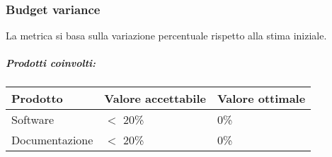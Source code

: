 \documentclass[a4paper, 12pt]{article}
\begin{document}
\subsubsection{Budget variance}
La metrica si basa sulla variazione percentuale rispetto alla stima iniziale.

\subparagraph{Prodotti coinvolti:}
\begin{center}
	\begin{tabularx}{\textwidth}{|X|X|X|}
		\hline
		\textbf{Prodotto} & \textbf{Valore accettabile } & \textbf{Valore ottimale } \\
		\hline
		Software          & $<$ 20\%                     & 0\%                       \\
		\hline
		Documentazione    & $<$ 20\%                     & 0\%                       \\
		\hline
	\end{tabularx}\\[8pt]
	\mbox{}\\
\end{center}
\end{document}
